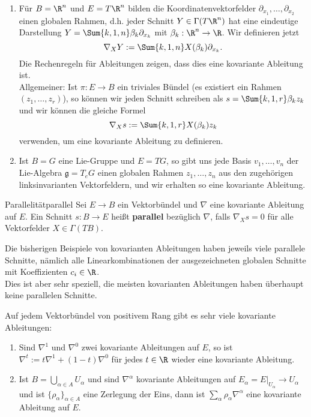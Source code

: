 \begin{beispiele}
\begin{enumerate}
\item Für $B = \R^n$ und $E=T\R^n$ bilden die Koordinatenvektorfelder $\partial_{x_1}, \dots, \partial_{x_2}$ einen globalen Rahmen, d.h. jeder Schnitt $Y \in \Gamma (T\R^n)$ hat eine eindeutige Darstellung $Y = \Sum{k, 1, n} \beta_k \partial_{x_k}$ mit $\beta_k: \R^n \to \R$. Wir definieren jetzt
\begin{equation}
\nabla_X Y := \Sum{k,1,n} X(\beta_k) \partial_{x_k}.
\end{equation}
Die Rechenregeln für Ableitungen zeigen, dass dies eine kovariante Ableitung ist.\\
Allgemeiner: Ist $\pi: E \to B$ ein triviales Bündel (es existiert ein Rahmen $(z_1, \dots, z_r)$), so können wir jeden Schnitt schreiben als $s = \Sum{k,1,r} \beta_k z_k$ und wir können die gleiche Formel
\begin{equation}
\nabla_X s := \Sum{k,1,r} X(\beta_k) z_k
\end{equation}
verwenden, um eine kovariante Ableitung zu definieren.
\item Ist $B=G$ eine Lie-Gruppe und $E = TG$, so gibt uns jede Basis $v_1, \dots, v_n$ der Lie-Algebra $\mathfrak{g} = T_eG$ einen globalen Rahmen $z_1, \dots, z_n$ aus den zugehörigen linksinvarianten Vektorfeldern, und wir erhalten so eine kovariante Ableitung.
\end{enumerate}
\end{beispiele}
\begin{definition}{Parallelität}{parallel}
Sei $E \to B$ ein Vektorbündel und $\nabla$ eine kovariante Ableitung auf $E$. Ein Schnitt $s: B \to E$ heißt \textbf{parallel} bezüglich $\nabla$, falls $\nabla_X s=0$ für alle Vektorfelder $X \in \Gamma (TB)$.
\end{definition}
Die bisherigen Beispiele von kovarianten Ableitungen haben jeweils viele parallele Schnitte, nämlich alle Linearkombinationen der ausgezeichneten globalen Schnitte mit Koeffizienten $c_i \in \R$.\\
Dies ist aber sehr speziell, die meisten kovarianten Ableitungen haben überhaupt keine parallelen Schnitte.\\
\begin{bemerkung}
Auf jedem Vektorbündel von positivem Rang gibt es sehr viele kovariante Ableitungen:
\begin{enumerate}
\item Sind $\nabla^1$ und $\nabla^0$ zwei kovariante Ableitungen auf $E$, so ist $\nabla^t := t \nabla^1 + (1-t) \nabla^0$ für jedes $t \in \R$ wieder eine kovariante Ableitung.
\item Ist $B = \bigcup_{\alpha \in A} U_\alpha$ und sind $\nabla^\alpha$ kovariante Ableitungen auf $E_\alpha = E|_{U_\alpha} \to U_\alpha$ und ist $\{ \rho_\alpha \}_{\alpha \in A}$ eine Zerlegung der Eins, dann ist $\sum_\alpha \rho_\alpha \nabla^\alpha$ eine kovariante Ableitung auf $E$.
\end{enumerate}
\end{bemerkung}
